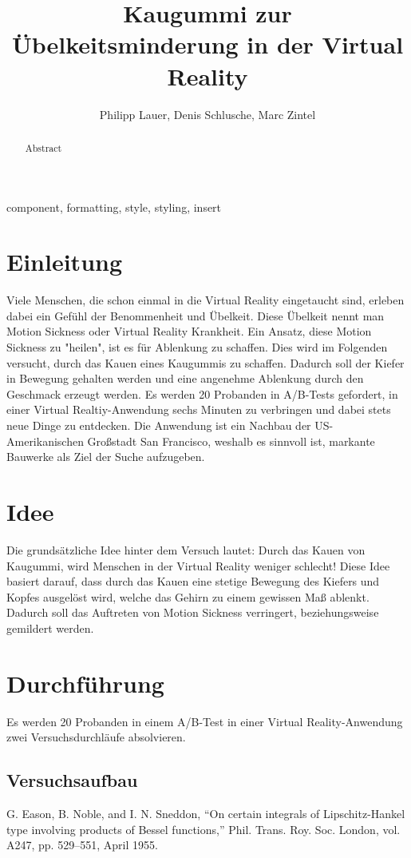 \documentclass[conference]{IEEEtran}
\begin{document}
\title{Kaugummi zur Übelkeitsminderung in der Virtual Reality\\}

\author{Philipp Lauer, Denis Schlusche, Marc Zintel}

\maketitle

\begin{abstract}
Abstract
\end{abstract}

\begin{IEEEkeywords}
component, formatting, style, styling, insert
\end{IEEEkeywords}

\section{Einleitung}
Viele Menschen, die schon einmal in die Virtual Reality eingetaucht sind, erleben dabei ein Gefühl der Benommenheit und Übelkeit. Diese Übelkeit nennt man Motion Sickness oder Virtual Reality Krankheit. Ein Ansatz, diese Motion Sickness zu "heilen", ist es für Ablenkung zu schaffen. Dies wird im Folgenden versucht, durch das Kauen eines Kaugummis zu schaffen. Dadurch soll der Kiefer in Bewegung gehalten werden und eine angenehme Ablenkung durch den Geschmack erzeugt werden. Es werden 20 Probanden in A/B-Tests gefordert, in einer Virtual Realtiy-Anwendung sechs Minuten zu verbringen und dabei stets neue Dinge zu entdecken. Die Anwendung ist ein Nachbau der US-Amerikanischen Großstadt San Francisco, weshalb es sinnvoll ist, markante Bauwerke als Ziel der Suche aufzugeben. 

\section{Idee}
Die grundsätzliche Idee hinter dem Versuch lautet: Durch das Kauen von Kaugummi, wird Menschen in der Virtual Reality weniger schlecht!
Diese Idee basiert darauf, dass durch das Kauen eine stetige Bewegung des Kiefers und Kopfes ausgelöst wird, welche das Gehirn zu einem gewissen Maß ablenkt. Dadurch soll das Auftreten von Motion Sickness verringert, beziehungsweise gemildert werden. 

\section{Durchführung}
Es werden 20 Probanden in einem A/B-Test in einer Virtual Reality-Anwendung zwei Versuchsdurchläufe absolvieren. 
\subsection{Versuchsaufbau}


\begin{thebibliography}{00}
 G. Eason, B. Noble, and I. N. Sneddon, ``On certain integrals of Lipschitz-Hankel type involving products of Bessel functions,'' Phil. Trans. Roy. Soc. London, vol. A247, pp. 529--551, April 1955.

\end{thebibliography}
\end{document}
